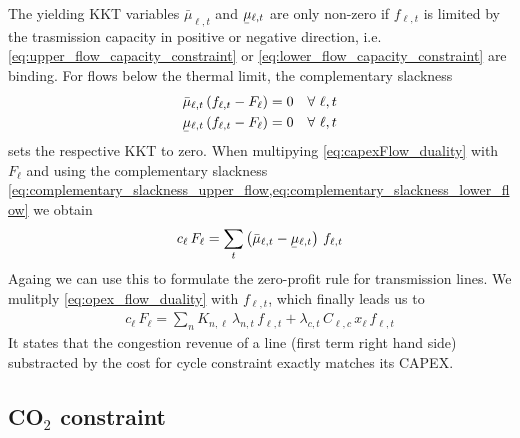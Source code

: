 \documentclass[11pt,twocolumn]{article}
\newcommand{\ubar}[1]{\underaccent{\bar}{#1}}
\newcommand{\Forall}[1]{\hspace{10pt} \forall \,\, #1 }
\newcommand{\capacityflow}{F_{\ell}}
\newcommand{\capitalpriceflow}{c_{\ell}}
\newcommand{\incidence}[1][n]{K_{#1,\ell}}
\newcommand{\mulowerflow}{\ubar{\mu}_{\ell,t}}
\newcommand{\muupperflow}{\bar{\mu}_{\ell,t}}
\newcommand{\lmp}[1][n]{\lambda_{#1,t}}
\newcommand{\flow}{f_{\ell,t}}
\newcommand{\cycle}{C_{\ell,c}}
\newcommand{\impedance}{x_\ell}
\newcommand{\cycleprice}{\lambda_{c,t}}
\begin{document}
The yielding KKT variables $\muupperflow$ and $\mulowerflow$ are only non-zero if $\flow$ is limited by the trasmission capacity in positive or negative direction, i.e. \cref{eq:upper_flow_capacity_constraint} or \cref{eq:lower_flow_capacity_constraint} are binding. For flows below the thermal limit, the complementary slackness 
\begin{align}
\muupperflow \left( \flow - \capacityflow \right)  &= 0 \Forall{\ell,t}
\label{eq:complementary_slackness_upper_flow} \\
\mulowerflow \left( \flow - \capacityflow \right) &=  0 \Forall{\ell,t}
\label{eq:complementary_slackness_lower_flow} 
\end{align}
sets the respective KKT to zero. 
When multipying \cref{eq:capexFlow_duality} with $\capacityflow$ and using the complementary slackness \cref{eq:complementary_slackness_upper_flow,eq:complementary_slackness_lower_flow} we obtain 
\begin{align}
 \capitalpriceflow \, \capacityflow = \sum_t \left( \muupperflow - \mulowerflow \right)  \, \flow
 \label{eq:capital_price_flow_sum}
\end{align}
Againg we can use this to formulate the zero-profit rule for transmission lines. We mulitply \cref{eq:opex_flow_duality} with $\flow$, which finally leads us to 
\begin{align}
\capitalpriceflow \, \capacityflow = \sum_n \incidence\, \lmp\, \flow + \cycleprice\, \cycle\, \impedance\, \flow 
\end{align}
It states that the congestion revenue of a line (first term right hand side) substracted by the cost for cycle constraint exactly matches its CAPEX. 





\subsection{CO$_2$ constraint}
\end{document}
